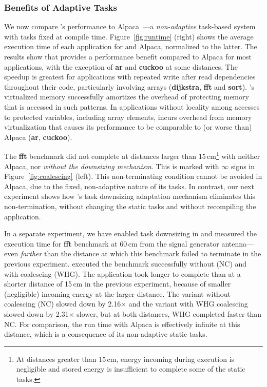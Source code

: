 
\subsubsection{Benefits of Adaptive Tasks}

We now compare \sys's performance to Alpaca~\cite{alpaca}---a
\emph{non-adaptive} task-based system with tasks fixed at compile time.
Figure~\ref{fig:runtime} (right) shows the average execution time of each
application for \sys and Alpaca, normalized to the latter. The results show
that \sys provides a performance benefit compared to Alpaca for most
applications, with the exception of \textbf{ar} and \textbf{cuckoo} at some
distances.  The speedup is greatest for applications with repeated write after
read dependencies throughout their code, particularly involving arrays
(\textbf{dijkstra}, \textbf{fft} and \textbf{sort}). \sys's virtualized memory
successfully amortizes the overhead of protecting memory that is accessed in
such patterns.  In applications without locality among accesses to protected
variables, including array elements, \sys incurs overhead from memory
virtualization that causes its performance to be comparable to (or worse than)
Alpaca (\textbf{ar}, \textbf{cuckoo}).

The \textbf{fft} benchmark did not complete at distances larger than
15\,cm\footnote{At distances greater than 15\,cm, energy incoming during
execution is negligible and stored energy is insufficient to complete some of
the static tasks.} with neither Alpaca, nor \sys \emph{without the downsizing
mechanism}. This is marked with $\infty$ signs in Figure~\ref{fig:coalescing}
(left).  This non-terminating condition cannot be avoided in Alpaca, due to the
fixed, non-adaptive nature of its tasks.  In contrast, our next experiment
shows how \sys's task downsizing adaptation mechanism eliminates this
non-termination, without changing the static tasks and without recompiling the
application.

In a separate experiment, we have enabled task downsizing in \sys and measured
the execution time for \textbf{fft} benchmark at 60\,cm from the signal
generator antenna---even \emph{farther} than the distance at which this
benchmark failed to terminate in the previous experiment. \sys executed the
benchmark successfully without (NC) and with coalescing (WHG). The application
took longer to complete than at a shorter distance of 15\,cm in the previous
experiment, because of smaller (negligible) incoming energy at the larger
distance. The variant without coalescing (NC) slowed down by 2.16$\times$ and the
variant with WHG coalescing slowed down by 2.31$\times$ slower, but at both
distances, WHG completed faster than NC.
%
For comparison, the run time with Alpaca is effectively infinite at this
distance, which is a consequence of its non-adaptive static tasks.

